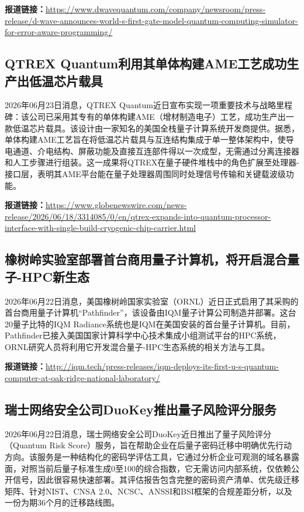 \documentclass[12pt,a4paper]{ctexart}
\begin{document}
\noindent\textbf{报道链接：}\url{https://www.dwavequantum.com/company/newsroom/press-release/d-wave-announces-world-s-first-gate-model-quantum-computing-simulator-for-error-aware-programming/}

\subsection{ QTREX Quantum利用其单体构建AME工艺成功生产出低温芯片载具 }

2026年06月23日消息，QTREX Quantum近日宣布实现一项重要技术与战略里程碑：该公司已采用其专有的单体构建AME（增材制造电子）工艺，成功生产出一款低温芯片载具。该设计由一家知名的美国全栈量子计算系统开发商提供。据悉，单体构建AME工艺旨在将低温芯片载具与互连结构集成于单一整体架构中，使导电通道、介电结构、屏蔽功能及直接互连部件得以一次成型，无需通过分离连接器和人工步骤进行组装。这一成果将QTREX在量子硬件堆栈中的角色扩展至处理器-接口层，表明其AME平台能在量子处理器周围同时处理信号传输和关键载波级功能。

\noindent\textbf{报道链接：}\url{https://www.globenewswire.com/news-release/2026/06/18/3314085/0/en/qtrex-expands-into-quantum-processor-interface-with-single-build-cryogenic-chip-carrier.html}

\subsection{ 橡树岭实验室部署首台商用量子计算机，将开启混合量子-HPC新生态 }

2026年06月22日消息，美国橡树岭国家实验室（ORNL）近日正式启用了其采购的首台商用量子计算机“Pathfinder”，该设备由IQM量子计算公司制造并部署。这台20量子比特的IQM Radiance系统也是IQM在美国安装的首台量子计算机。目前，Pathfinder已接入美国国家计算科学中心技术集成小组测试平台的HPC系统，ORNL研究人员将利用它开发混合量子-HPC生态系统的相关方法与工具。

\noindent\textbf{报道链接：}\url{http://iqm.tech/press-releases/iqm-deploys-its-first-u-s-quantum-computer-at-oak-ridge-national-laboratory/}

\subsection{ 瑞士网络安全公司DuoKey推出量子风险评分服务 }

2026年06月22日消息，瑞士网络安全公司DuoKey近日推出了量子风险评分（Quantum Risk Score）服务，旨在帮助企业在后量子密码迁移中明确优先行动方向。该服务是一种结构化的密码学评估工具，它通过分析企业可观测的域名暴露面，对照当前后量子标准生成0至100的综合指数，它无需访问内部系统，仅依赖公开信号，因此很容易快速部署。其评估报告包含完整的密码资产清单、优先级迁移矩阵、针对NIST、CNSA 2.0、NCSC、ANSSI和BSI框架的合规差距分析，以及一份为期36个月的迁移路线图。
\end{document}

